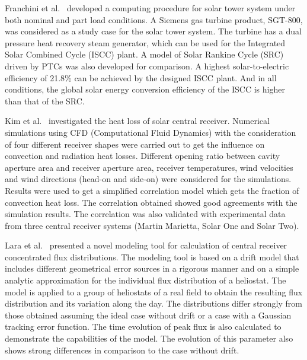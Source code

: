Franchini et al.~\cite{Franchini2013} developed a computing procedure for solar tower system under both nominal and part load conditions. A Siemens gas turbine product, SGT-800, was considered as a study case for the solar tower system. The turbine has a dual pressure heat recovery steam generator, which can be used for the Integrated Solar Combined Cycle (ISCC) plant. A model of Solar Rankine Cycle (SRC) driven by PTCs was also developed for comparison. A highest solar-to-electric efficiency of 21.8\% can be achieved by the designed ISCC plant. And in all conditions, the global solar energy conversion efficiency of the ISCC is higher than that of the SRC.

Kim et al.~\cite{Kim2015} investigated the heat loss of solar central receiver. Numerical simulations using CFD (Computational Fluid Dynamics) with the consideration of four different receiver shapes were carried out to get the influence on convection and radiation heat losses. Different opening ratio between cavity aperture area and receiver aperture area, receiver temperatures, wind velocities and wind directions (head-on and side-on) were considered for the simulations. Results were used to get a simplified correlation model which gets the fraction of convection heat loss. The correlation obtained showed good agreements with the simulation results. The correlation was also validated with experimental data from three central receiver systems (Martin Marietta, Solar One and Solar Two).

Lara et al.~\cite{Lara2016} presented a novel modeling tool for calculation of central receiver concentrated flux distributions. The modeling tool is based on a drift model that includes different geometrical error sources in a rigorous manner and on a simple analytic approximation for the individual flux distribution of a heliostat. The model is applied to a group of heliostats of a real field to obtain the resulting flux distribution and its variation along the day. The distributions differ strongly from those obtained assuming the ideal case without drift or a case with a Gaussian tracking error function. The time evolution of peak flux is also calculated to demonstrate the capabilities of the model. The evolution of this parameter also shows strong differences in comparison to the case without drift.

